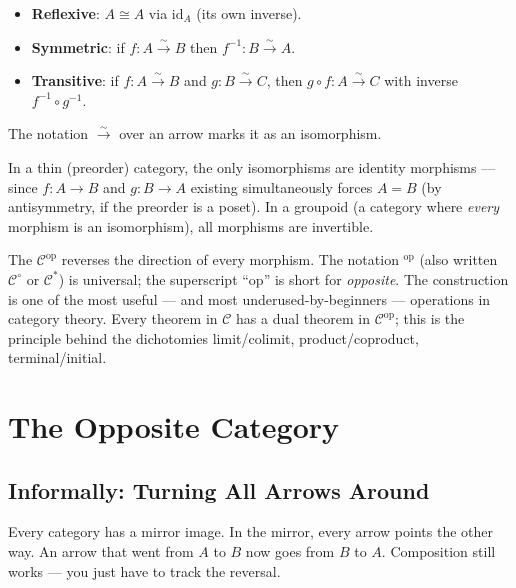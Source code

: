 \begin{itemize}
  \item \textbf{Reflexive}: $A \cong A$ via $\mathrm{id}_A$ (its own inverse).
  \item \textbf{Symmetric}: if $f : A \xrightarrow{\sim} B$ then
        $f^{-1} : B \xrightarrow{\sim} A$.
  \item \textbf{Transitive}: if $f : A \xrightarrow{\sim} B$ and
        $g : B \xrightarrow{\sim} C$, then $g \circ f : A \xrightarrow{\sim} C$
        with inverse $f^{-1} \circ g^{-1}$.
\end{itemize}

The notation $\xrightarrow{\sim}$ over an arrow marks it as an isomorphism.

In a thin (preorder) category, the only isomorphisms are identity morphisms
--- since $f : A \to B$ and $g : B \to A$ existing simultaneously forces
$A = B$ (by antisymmetry, if the preorder is a poset). In a groupoid
(a category where \emph{every} morphism is an isomorphism), all morphisms
are invertible.


\begin{nameorigin}
The  $\mathcal{C}^{\mathrm{op}}$ reverses the
direction of every morphism. The notation $^{\mathrm{op}}$ (also written
$\mathcal{C}^\circ$ or $\mathcal{C}^{*}$) is universal; the superscript
``op'' is short for \emph{opposite}. The construction is one of the most
useful — and most underused-by-beginners — operations in category theory.
Every theorem in $\mathcal{C}$ has a dual theorem in $\mathcal{C}^{\mathrm{op}}$;
this is the principle behind the dichotomies limit/colimit,
product/coproduct, terminal/initial.
\end{nameorigin}

\section{The Opposite Category}
\label{sec:opposite-category}

\subsection{Informally: Turning All Arrows Around}

Every category has a mirror image. In the mirror, every arrow points the
other way. An arrow that went from $A$ to $B$ now goes from $B$ to $A$.
Composition still works --- you just have to track the reversal.

